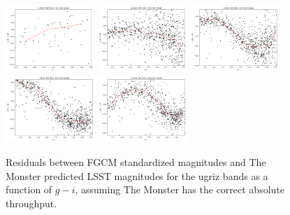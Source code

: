 \begin{figure}
  \begin{center}
    \includegraphics[width=0.3\textwidth]{photometric_calibration_figures/reference_residuals_u.png}
    \includegraphics[width=0.3\textwidth]{photometric_calibration_figures/reference_residuals_g.png}
    \includegraphics[width=0.3\textwidth]{photometric_calibration_figures/reference_residuals_r.png}
    \includegraphics[width=0.3\textwidth]{photometric_calibration_figures/reference_residuals_i.png}
    \includegraphics[width=0.3\textwidth]{photometric_calibration_figures/reference_residuals_z.png}
  \end{center}
  \caption{Residuals between FGCM standardized magnitudes and The Monster
    predicted LSST magnitudes for the ugriz bands as a function of $g-i$, assuming
    The Monster has the correct absolute throughput.}
\end{figure}

